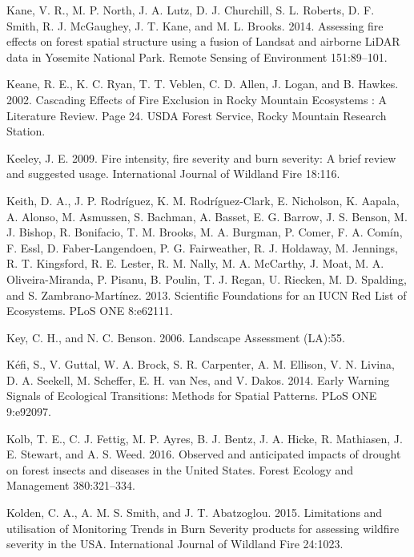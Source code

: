\documentclass[twoside,12pt,final]{ucthesis-CA2012}
\begin{document}
\begin{ucmainmatter}
\hypertarget{ref-kane2014}{}
Kane, V. R., M. P. North, J. A. Lutz, D. J. Churchill, S. L. Roberts, D.
F. Smith, R. J. McGaughey, J. T. Kane, and M. L. Brooks. 2014. Assessing
fire effects on forest spatial structure using a fusion of Landsat and
airborne LiDAR data in Yosemite National Park. Remote Sensing of
Environment 151:89--101.

\hypertarget{ref-keane2002a}{}
Keane, R. E., K. C. Ryan, T. T. Veblen, C. D. Allen, J. Logan, and B.
Hawkes. 2002. Cascading Effects of Fire Exclusion in Rocky Mountain
Ecosystems : A Literature Review. Page 24. USDA Forest Service, Rocky
Mountain Research Station.

\hypertarget{ref-keeley2009}{}
Keeley, J. E. 2009. Fire intensity, fire severity and burn severity: A
brief review and suggested usage. International Journal of Wildland Fire
18:116.

\hypertarget{ref-keith2013}{}
Keith, D. A., J. P. Rodríguez, K. M. Rodríguez-Clark, E. Nicholson, K.
Aapala, A. Alonso, M. Asmussen, S. Bachman, A. Basset, E. G. Barrow, J.
S. Benson, M. J. Bishop, R. Bonifacio, T. M. Brooks, M. A. Burgman, P.
Comer, F. A. Comín, F. Essl, D. Faber-Langendoen, P. G. Fairweather, R.
J. Holdaway, M. Jennings, R. T. Kingsford, R. E. Lester, R. M. Nally, M.
A. McCarthy, J. Moat, M. A. Oliveira-Miranda, P. Pisanu, B. Poulin, T.
J. Regan, U. Riecken, M. D. Spalding, and S. Zambrano-Martínez. 2013.
Scientific Foundations for an IUCN Red List of Ecosystems. PLoS ONE
8:e62111.

\hypertarget{ref-key2006}{}
Key, C. H., and N. C. Benson. 2006. Landscape Assessment (LA):55.

\hypertarget{ref-kefi2014}{}
Kéfi, S., V. Guttal, W. A. Brock, S. R. Carpenter, A. M. Ellison, V. N.
Livina, D. A. Seekell, M. Scheffer, E. H. van Nes, and V. Dakos. 2014.
Early Warning Signals of Ecological Transitions: Methods for Spatial
Patterns. PLoS ONE 9:e92097.

\hypertarget{ref-kolb2016}{}
Kolb, T. E., C. J. Fettig, M. P. Ayres, B. J. Bentz, J. A. Hicke, R.
Mathiasen, J. E. Stewart, and A. S. Weed. 2016. Observed and anticipated
impacts of drought on forest insects and diseases in the United States.
Forest Ecology and Management 380:321--334.

\hypertarget{ref-kolden2015}{}
Kolden, C. A., A. M. S. Smith, and J. T. Abatzoglou. 2015. Limitations
and utilisation of Monitoring Trends in Burn Severity products for
assessing wildfire severity in the USA. International Journal of
Wildland Fire 24:1023.


\end{ucmainmatter}
\end{document}

